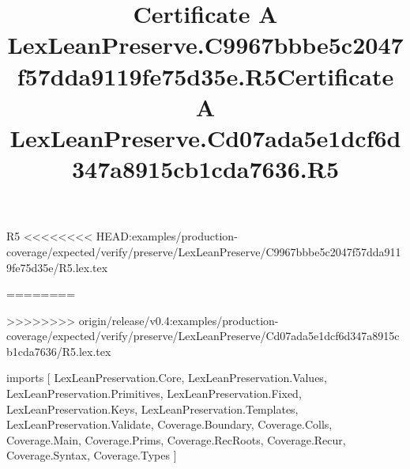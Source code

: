 \begin{lexlean}{R5}
<<<<<<<< HEAD:examples/production-coverage/expected/verify/preserve/LexLeanPreserve/C9967bbbe5c2047f57dda9119fe75d35e/R5.lex.tex
\title{Certificate A LexLeanPreserve.C9967bbbe5c2047f57dda9119fe75d35e.R5}
========
\title{Certificate A LexLeanPreserve.Cd07ada5e1dcf6d347a8915cb1cda7636.R5}
>>>>>>>> origin/release/v0.4:examples/production-coverage/expected/verify/preserve/LexLeanPreserve/Cd07ada5e1dcf6d347a8915cb1cda7636/R5.lex.tex
\begin{coremodule}
imports [
  LexLeanPreservation.Core,
  LexLeanPreservation.Values,
  LexLeanPreservation.Primitives,
  LexLeanPreservation.Fixed,
  LexLeanPreservation.Keys,
  LexLeanPreservation.Templates,
  LexLeanPreservation.Validate,
  Coverage.Boundary,
  Coverage.Colls,
  Coverage.Main,
  Coverage.Prims,
  Coverage.RecRoots,
  Coverage.Recur,
  Coverage.Syntax,
  Coverage.Types
]


\end{coremodule}
\end{lexlean}
